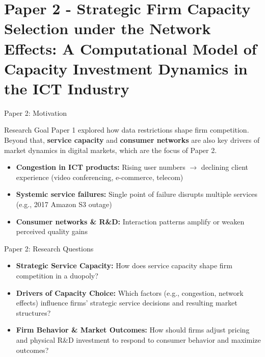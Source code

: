 \documentclass[10pt,aspectratio=169]{beamer}
\begin{document}
\section{Paper 2 - Strategic Firm Capacity Selection under the Network Effects: A Computational Model of Capacity Investment Dynamics in the ICT Industry}
\begin{frame}{Paper 2: Motivation}

\begin{alertblock}{Research Goal}
Paper 1 explored how data restrictions shape firm competition. Beyond that, \textbf{service capacity} and \textbf{consumer networks} are also key drivers of market dynamics in digital markets, which are the focus of Paper 2.
\end{alertblock}

\begin{itemize}
    \item \textbf{Congestion in ICT products:} Rising user numbers $\rightarrow$ declining client experience (video conferencing, e-commerce, telecom)
    
    \vspace{2mm}
    \item \textbf{Systemic service failures:} Single point of failure disrupts multiple services (e.g., 2017 Amazon S3 outage)
    
    \vspace{2mm}
    \item \textbf{Consumer networks \& R\&D:} Interaction patterns amplify or weaken perceived quality gains
\end{itemize}
\end{frame}
  
    
\begin{frame}{Paper 2: Research Questions}
\begin{itemize}
    \item \textbf{Strategic Service Capacity:}  
    How does service capacity shape firm competition in a duopoly?

    \vspace{2mm}
    \item \textbf{Drivers of Capacity Choice:}  
    Which factors (e.g., congestion, network effects) influence firms’ strategic service decisions and resulting market structures?

    \vspace{2mm}
    \item \textbf{Firm Behavior \& Market Outcomes:}  
    How should firms adjust pricing and physical R\&D investment to respond to consumer behavior and maximize outcomes?

\end{itemize}
\end{frame}
\end{document}
